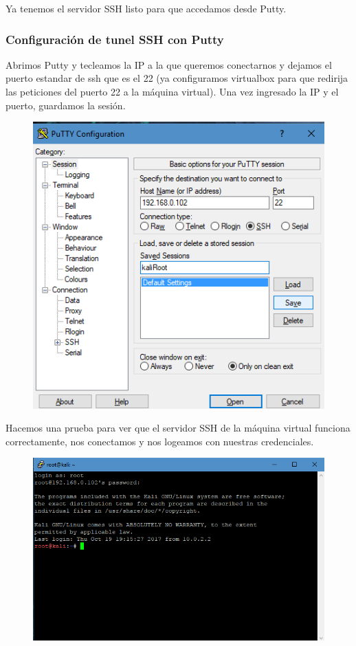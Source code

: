 \documentclass{article}
\begin{document}
Ya tenemos el servidor SSH listo para que accedamos desde Putty.

\subsubsection{Configuraci\'on de tunel SSH con Putty}

Abrimos Putty y tecleamos la IP a la que queremos conectarnos y dejamos el puerto estandar de ssh que es el 22 (ya configuramos virtualbox para que redirija las peticiones del puerto 22 a la m\'aquina virtual). Una vez ingresado la IP y el puerto, guardamos la sesi\'on.

\begin{figure}[H]
\centering
\includegraphics[width=1\textwidth]{08-GUARDARKALIPUTTY}
\end{figure}

Hacemos una prueba para ver que el servidor SSH de la m\'aquina virtual funciona correctamente, nos conectamos y nos logeamos con nuestras credenciales.

\begin{figure}[H]
\centering
\includegraphics[width=1\textwidth]{09-LOGEADOSSH}
\end{figure}
\end{document}

